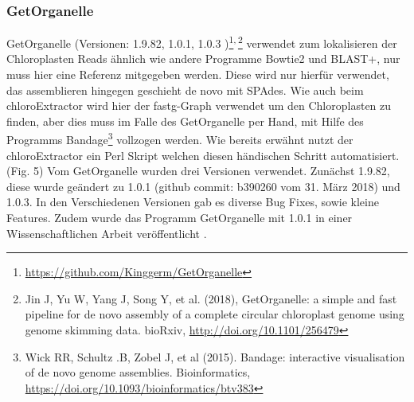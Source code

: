 \documentclass{scrartcl}
\begin{document}
\subsubsection{GetOrganelle}
\label{sec-2-5-5}
GetOrganelle (Versionen: 1.9.82, 1.0.1, 1.0.3 )\footnote{\url{https://github.com/Kinggerm/GetOrganelle}}\textsuperscript{,}\,\footnote{Jin J, Yu W, Yang J, Song Y, et al. (2018), GetOrganelle: a simple and fast pipeline for de novo assembly of a complete circular chloroplast genome using genome skimming data. bioRxiv, \url{http://doi.org/10.1101/256479}} verwendet zum lokalisieren der Chloroplasten Reads ähnlich wie andere Programme Bowtie2 \footnotemark[19]{} und BLAST+, nur muss hier eine Referenz mitgegeben werden. 
Diese wird nur hierfür
verwendet, das assemblieren hingegen geschieht de novo mit SPAdes. Wie auch beim chloroExtractor wird hier der fastg-Graph verwendet um den Chloroplasten zu finden, aber dies muss im Falle 
des GetOrganelle per Hand, mit Hilfe des Programms Bandage\footnote{Wick RR, Schultz .B, Zobel J, et al (2015). Bandage: interactive visualisation of de novo genome assemblies. Bioinformatics, \url{https://doi.org/10.1093/bioinformatics/btv383}} vollzogen werden. Wie bereits erwähnt nutzt der chloroExtractor ein Perl Skript welchen diesen händischen Schritt automatisiert.(Fig. 5) 
Vom GetOrganelle wurden drei Versionen verwendet. Zunächst 1.9.82, diese wurde geändert zu 1.0.1 (github commit: b390260 vom 31. März 2018) und 1.0.3. In den Verschiedenen Versionen gab es diverse Bug Fixes, sowie
kleine Features.
Zudem wurde das Programm GetOrganelle mit 1.0.1 in einer Wissenschaftlichen Arbeit veröffentlicht \footnotemark[30]{}.
\end{document}
